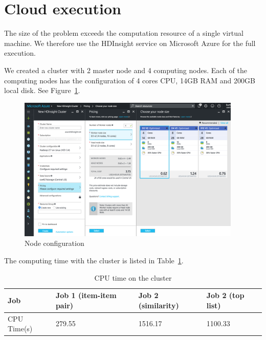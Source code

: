 \section{Cloud execution}
The size of the problem exceeds the computation resource of a single
virtual machine. We therefore use the HDInsight service on Microsoft
Azure for the full execution.

We created a cluster with 2 master node and 4 computing nodes. Each of
the computing nodes has the configuration of 4 cores CPU, 14GB RAM and
200GB local disk. See Figure~\ref{fig:node}.
\begin{figure}[!ht]
  \centering
  \includegraphics[width=0.95\textwidth]{images/node}
  \caption{Node configuration}
  \label{fig:node}
\end{figure}

The computing time with the cluster is listed in Table~\ref{tab:clustertime}.
\begin{table}[!ht]
  \centering
  \begin{tabular}{|p{2.5cm}|p{4cm}|p{3cm}|p{3cm}|}
    \hline
    Job & Job 1 (item-item pair) & Job 2 (similarity) & Job 2 (top list)\\
    \hline
    CPU Time(s) & 279.55 & 1516.17 & 1100.33\\
    \hline
  \end{tabular}
  \caption{CPU time on the cluster}
  \label{tab:clustertime}
\end{table}
